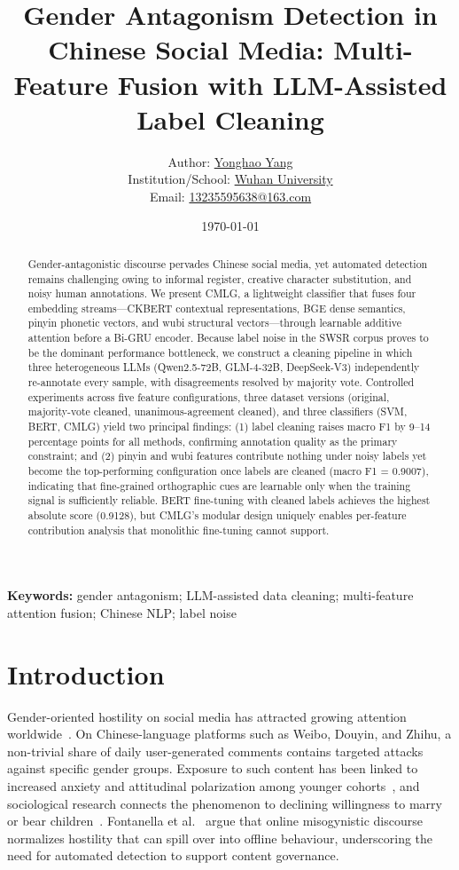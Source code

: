 ﻿\documentclass[12pt]{article}
\title{Gender Antagonism Detection in Chinese Social Media: Multi-Feature Fusion with LLM-Assisted Label Cleaning}
\author{%
Author: \underline{Yonghao Yang} \\
Institution/School: \underline{Wuhan University} \\
Email: \underline{13235595638@163.com}%
}
\date{\today}
\begin{document}
\maketitle

\begin{abstract}
Gender-antagonistic discourse pervades Chinese social media, yet automated detection remains challenging owing to informal register, creative character substitution, and noisy human annotations. We present CMLG, a lightweight classifier that fuses four embedding streams---CKBERT contextual representations, BGE dense semantics, pinyin phonetic vectors, and wubi structural vectors---through learnable additive attention before a Bi-GRU encoder. Because label noise in the SWSR corpus proves to be the dominant performance bottleneck, we construct a cleaning pipeline in which three heterogeneous LLMs (Qwen2.5-72B, GLM-4-32B, DeepSeek-V3) independently re-annotate every sample, with disagreements resolved by majority vote. Controlled experiments across five feature configurations, three dataset versions (original, majority-vote cleaned, unanimous-agreement cleaned), and three classifiers (SVM, BERT, CMLG) yield two principal findings: (1) label cleaning raises macro F1 by 9--14 percentage points for all methods, confirming annotation quality as the primary constraint; and (2) pinyin and wubi features contribute nothing under noisy labels yet become the top-performing configuration once labels are cleaned (macro F1 = 0.9007), indicating that fine-grained orthographic cues are learnable only when the training signal is sufficiently reliable. BERT fine-tuning with cleaned labels achieves the highest absolute score (0.9128), but CMLG's modular design uniquely enables per-feature contribution analysis that monolithic fine-tuning cannot support.
\end{abstract}

\noindent\textbf{Keywords:} gender antagonism; LLM-assisted data cleaning; multi-feature attention fusion; Chinese NLP; label noise

\section{Introduction}
Gender-oriented hostility on social media has attracted growing attention worldwide~\cite{luo2025survey,qin2024impact}. On Chinese-language platforms such as Weibo, Douyin, and Zhihu, a non-trivial share of daily user-generated comments contains targeted attacks against specific gender groups. Exposure to such content has been linked to increased anxiety and attitudinal polarization among younger cohorts~\cite{qin2024impact}, and sociological research connects the phenomenon to declining willingness to marry or bear children~\cite{qin2024impact,fontanella2024misogyny}. Fontanella et al.~\cite{fontanella2024misogyny} argue that online misogynistic discourse normalizes hostility that can spill over into offline behaviour, underscoring the need for automated detection to support content governance.
\end{document}
